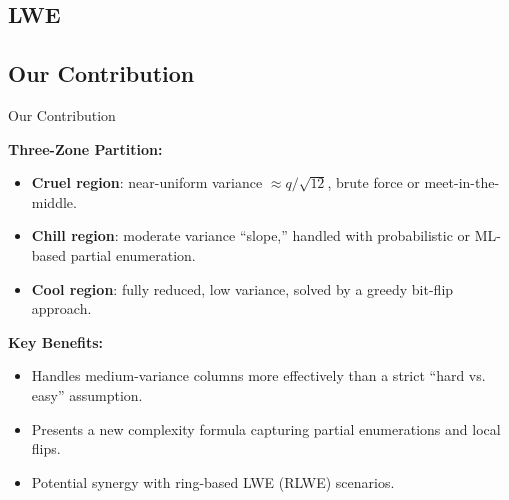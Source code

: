 \documentclass{beamer}
\begin{document}
  \subsection*{LWE}
  \subsection*{Our Contribution}
  \begin{frame}{Our Contribution}
  
    \textbf{Three-Zone Partition:}
    \begin{itemize}
      \item \textbf{Cruel region}: near-uniform variance $\approx q/\sqrt{12}$, brute force or meet-in-the-middle.
      \item \textbf{Chill region}: moderate variance “slope,” handled with probabilistic or ML-based partial enumeration.
      \item \textbf{Cool region}: fully reduced, low variance, solved by a greedy bit-flip approach.
    \end{itemize}
  
    \textbf{Key Benefits:}
    \begin{itemize}
      \item Handles medium-variance columns more effectively than a strict “hard vs. easy” assumption.
      \item Presents a new complexity formula capturing partial enumerations and local flips.
      \item Potential synergy with ring-based LWE (RLWE) scenarios.
    \end{itemize}
  \end{frame}

\end{document}
